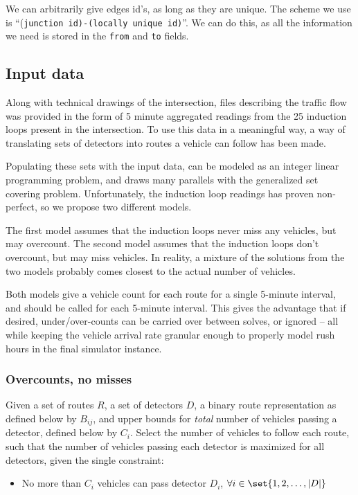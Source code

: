 We can arbitrarily give edges id's, as long as they are unique. The scheme we
use is ``(\texttt{junction id)-(locally unique id)}''. We can do this, as all the
information we need is stored in the \texttt{from} and \texttt{to} fields.

\subsection{Input data}

Along with technical drawings of the intersection, files describing the traffic flow was provided in the form of 5 minute aggregated readings from the 25 induction loops present in the intersection.
To use this data in a meaningful way, a way of translating sets of detectors into routes a vehicle can follow has been made. 

Populating these sets with the input data, can be modeled as an integer linear programming problem, and draws many parallels with the generalized set covering problem.
Unfortunately, the induction loop readings has proven non-perfect, so we propose two different models.

The first model assumes that the induction loops never miss any vehicles, but may overcount.
The second model assumes that the induction loops don't overcount, but may miss vehicles. 
In reality, a mixture of the solutions from the two models probably comes closest to the actual number of vehicles. 

Both models give a vehicle count for each route for a single 5-minute interval, and should be called for each 5-minute interval.
This gives the advantage that if desired, under/over-counts can be carried over between solves, or ignored -- all while keeping the vehicle arrival rate granular enough to properly model rush hours in the final simulator instance.

\subsubsection{Overcounts, no misses}
Given a set of routes $R$, a set of detectors $D$, a binary route representation as defined below by $B_{ij}$, and upper bounds for \textit{total} number of vehicles passing a detector, defined below by $C_i$. 
Select the number of vehicles to follow each route, such that the number of vehicles passing each detector is maximized for all detectors, given the single constraint:
\begin{itemize}
  \item No more than $C_i$ vehicles can pass detector $D_i$, $\forall i \in \set{1, 2, \ldots, |D|}$
\end{itemize}

